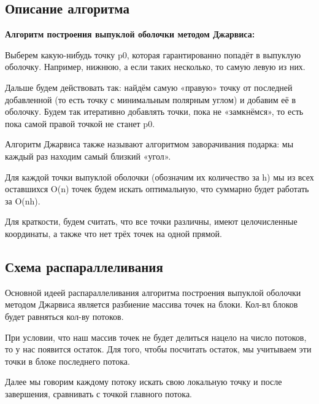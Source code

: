 \documentclass{report}
\begin{document}
\begin{center}
\section*{Описание алгоритма}
\end{center}
\textbf{Алгоритм построения выпуклой оболочки методом Джарвиса:}
\par Выберем какую-нибудь точку p0, которая гарантированно попадёт в выпуклую оболочку. Например, нижнюю, а если таких несколько, то самую левую из них.
\par Дальше будем действовать так: найдём самую «правую» точку от последней добавленной (то есть точку с минимальным полярным углом) и добавим её в оболочку. Будем так итеративно добавлять точки, пока не «замкнёмся», то есть пока самой правой точкой не станет p0.
\par Алгоритм Джарвиса также называют алгоритмом заворачивания подарка: мы каждый раз находим самый близкий «угол».
\par Для каждой точки выпуклой оболочки (обозначим их количество за h) мы из всех оставшихся O(n) точек будем искать оптимальную, что суммарно будет работать за O(nh).
\par Для краткости, будем считать, что все точки различны, имеют целочисленные координаты, а также что нет трёх точек на одной прямой.
\newpage

\begin{center}
\section*{Схема распараллеливания}
\end{center}
\par Основной идеей распараллеливания алгоритма построения выпуклой оболочки методом Джарвиса является разбиение массива точек на блоки. Кол-вл блоков будет равняться кол-ву потоков.
\par При условии, что наш массив точек не будет делиться нацело на число потоков, то у нас появится остаток. Для того, чтобы посчитать остаток, мы учитываем эти точки в блоке последнего потока.
\par Далее мы говорим каждому потоку искать свою локальную точку и после завершения, сравнивать с точкой главного потока.
\newpage
\end{document}
